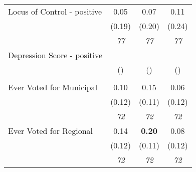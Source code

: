 \begin{tabular}{l c c c}
Locus of Control - positive & 0.05 & 0.07 & 0.11 \\
& (0.19) & (0.20) & (0.24) \\
& \textit{ 77 } & \textit{ 77 } & \textit{ 77 } \\
Depression Score - positive & & & \\
& () & () & () \\
& & & \\
Ever Voted for Municipal & 0.10 & 0.15 & 0.06 \\
& (0.12) & (0.11) & (0.12) \\
& \textit{ 72 } & \textit{ 72 } & \textit{ 72 } \\
Ever Voted for Regional & 0.14 & \textbf{ 0.20 } & 0.08 \\
& (0.12) & (0.11) & (0.12) \\
& \textit{ 72 } & \textit{ 72 } & \textit{ 72 } \\
\bottomrule
\end{tabular}
